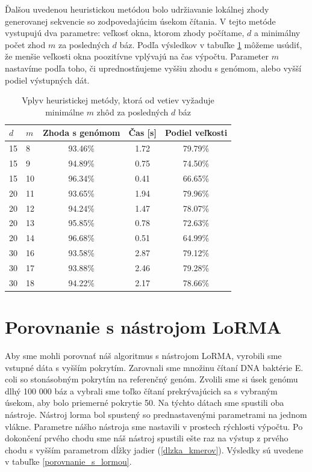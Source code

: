 Ďalšou uvedenou heuristickou metódou bolo udržiavanie lokálnej zhody generovanej sekvencie so zodpovedajúcim úsekom čítania. V tejto metóde vystupujú dva parametre: veľkosť okna, ktorom zhody počítame, $d$ a minimálny počet zhod $m$ za posledných $d$ báz. Podľa výsledkov v tabuľke \ref{local_match_rate} môžeme usúdiť, že menšie veľkosti okna poozitívne vplývajú na čas výpočtu. Parameter $m$ nastavíme podľa toho, či uprednostňujeme vyššiu zhodu s genómom, alebo vyšší podiel výstupných dát.

\begin{table}
    \fontsize{11}{13}\selectfont
    \centering
    \begin{tabular}{ | l | l || c | c | c | }
    \hline 
$d$ & $m$ & Zhoda s genómom & Čas [s] & Podiel veľkosti \\ \hline \hline
15 & 8 & 93.46\% & 1.72 & 79.79\% \\ \hline
15 & 9 & 94.89\% & 0.75 & 74.50\% \\ \hline
15 & 10 & 96.34\% & 0.41 & 66.65\% \\ \hline
20 & 11 & 93.65\% & 1.94 & 79.96\% \\ \hline
20 & 12 & 94.24\% & 1.47 & 78.07\% \\ \hline
20 & 13 & 95.85\% & 0.78 & 72.63\% \\ \hline
20 & 14 & 96.68\% & 0.51 & 64.99\% \\ \hline
30 & 16 & 93.58\% & 2.87 & 79.12\% \\ \hline
30 & 17 & 93.88\% & 2.46 & 79.28\% \\ \hline
30 & 18 & 94.22\% & 2.17 & 78.66\% \\ \hline
    \end{tabular}
    \caption{Vplyv heuristickej metódy, ktorá od vetiev vyžaduje minimálne $m$ zhôd za posledných $d$ báz}
    \label{local_match_rate}
\end{table}

\section{Porovnanie s nástrojom LoRMA}

Aby sme mohli porovnať náš algoritmus s nástrojom LoRMA, vyrobili sme vstupné dáta s vyšším pokrytím. Zarovnali sme množinu čítaní DNA baktérie E. coli so stonásobným pokrytím na referenčný genóm. Zvolili sme si úsek genómu dlhý 100 000 báz a vybrali sme toľko čítaní prekrývajúcich sa s vybraným úsekom, aby bolo priemerné pokrytie 50.
Na týchto dátach sme spustili oba nástroje. Nástroj lorma bol spustený so prednastavenými parametrami na jednom vlákne. Parametre nášho nástroja sme nastavili v prostech rýchlosti výpočtu. Po dokončení prvého chodu sme náš nástroj spustili ešte raz na výstup z prvého chodu s vyšším parametrom dĺžky jadier (\ref{dlzka_kmerov}). Výsledky sú uvedene v tabuľke \ref{porovnanie_s_lormou}.

